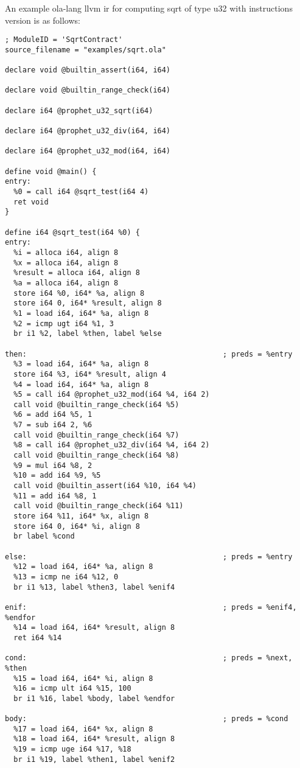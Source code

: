 An example ola-lang llvm ir for computing sqrt of type u32 with instructions version is as follows:
\begin{lstlisting}[language={}]
; ModuleID = 'SqrtContract'
source_filename = "examples/sqrt.ola"

declare void @builtin_assert(i64, i64)

declare void @builtin_range_check(i64)

declare i64 @prophet_u32_sqrt(i64)

declare i64 @prophet_u32_div(i64, i64)

declare i64 @prophet_u32_mod(i64, i64)

define void @main() {
entry:
  %0 = call i64 @sqrt_test(i64 4)
  ret void
}

define i64 @sqrt_test(i64 %0) {
entry:
  %i = alloca i64, align 8
  %x = alloca i64, align 8
  %result = alloca i64, align 8
  %a = alloca i64, align 8
  store i64 %0, i64* %a, align 8
  store i64 0, i64* %result, align 8
  %1 = load i64, i64* %a, align 8
  %2 = icmp ugt i64 %1, 3
  br i1 %2, label %then, label %else

then:                                             ; preds = %entry
  %3 = load i64, i64* %a, align 8
  store i64 %3, i64* %result, align 4
  %4 = load i64, i64* %a, align 8
  %5 = call i64 @prophet_u32_mod(i64 %4, i64 2)
  call void @builtin_range_check(i64 %5)
  %6 = add i64 %5, 1
  %7 = sub i64 2, %6
  call void @builtin_range_check(i64 %7)
  %8 = call i64 @prophet_u32_div(i64 %4, i64 2)
  call void @builtin_range_check(i64 %8)
  %9 = mul i64 %8, 2
  %10 = add i64 %9, %5
  call void @builtin_assert(i64 %10, i64 %4)
  %11 = add i64 %8, 1
  call void @builtin_range_check(i64 %11)
  store i64 %11, i64* %x, align 8
  store i64 0, i64* %i, align 8
  br label %cond

else:                                             ; preds = %entry
  %12 = load i64, i64* %a, align 8
  %13 = icmp ne i64 %12, 0
  br i1 %13, label %then3, label %enif4

enif:                                             ; preds = %enif4, %endfor
  %14 = load i64, i64* %result, align 8
  ret i64 %14

cond:                                             ; preds = %next, %then
  %15 = load i64, i64* %i, align 8
  %16 = icmp ult i64 %15, 100
  br i1 %16, label %body, label %endfor

body:                                             ; preds = %cond
  %17 = load i64, i64* %x, align 8
  %18 = load i64, i64* %result, align 8
  %19 = icmp uge i64 %17, %18
  br i1 %19, label %then1, label %enif2


\end{lstlisting}

